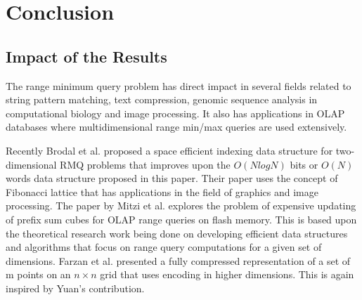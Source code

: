 \section{Conclusion}
\subsection*{Impact of the Results}
The range minimum query problem has direct impact in several fields related to string pattern matching, text compression, genomic sequence analysis in computational biology and image  processing. It also has applications in OLAP databases where multidimensional range min/max queries are used extensively.\par
Recently Brodal et al.\cite{p11} proposed a space efficient indexing data structure for two-dimensional RMQ problems that improves upon the $O(NlogN)$ bits or $O(N)$ words data structure proposed in this paper. Their paper uses the concept of Fibonacci lattice that has applications in the field of graphics and image processing. The paper by Mitzi et al.\cite{p12} explores the problem of expensive updating of prefix sum cubes for OLAP range queries on flash memory. This is based upon the theoretical research work being done on developing efficient data structures and algorithms that focus on range query computations for a given set of dimensions. Farzan et al. \cite{p14} presented a fully compressed representation of a set of m points on an $n \times n$ grid that uses encoding in higher dimensions. This is again inspired by Yuan's contribution.
